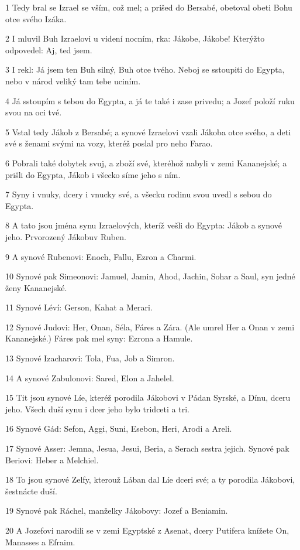 \par 1 Tedy bral se Izrael se vším, což mel; a prišed do Bersabé, obetoval obeti Bohu otce svého Izáka.
\par 2 I mluvil Buh Izraelovi u videní nocním, rka: Jákobe, Jákobe! Kterýžto odpovedel: Aj, ted jsem.
\par 3 I rekl: Já jsem ten Buh silný, Buh otce tvého. Neboj se sstoupiti do Egypta, nebo v národ veliký tam tebe uciním.
\par 4 Já sstoupím s tebou do Egypta, a já te také i zase privedu; a Jozef položí ruku svou na oci tvé.
\par 5 Vstal tedy Jákob z Bersabé; a synové Izraelovi vzali Jákoba otce svého, a deti své s ženami svými na vozy, kteréž poslal pro neho Farao.
\par 6 Pobrali také dobytek svuj, a zboží své, kteréhož nabyli v zemi Kananejské; a prišli do Egypta, Jákob i všecko síme jeho s ním.
\par 7 Syny i vnuky, dcery i vnucky své, a všecku rodinu svou uvedl s sebou do Egypta.
\par 8 A tato jsou jména synu Izraelových, kteríž vešli do Egypta: Jákob a synové jeho. Prvorozený Jákobuv Ruben.
\par 9 A synové Rubenovi: Enoch, Fallu, Ezron a Charmi.
\par 10 Synové pak Simeonovi: Jamuel, Jamin, Ahod, Jachin, Sohar a Saul, syn jedné ženy Kananejské.
\par 11 Synové Léví: Gerson, Kahat a Merari.
\par 12 Synové Judovi: Her, Onan, Séla, Fáres a Zára. (Ale umrel Her a Onan v zemi Kananejské.) Fáres pak mel syny: Ezrona a Hamule.
\par 13 Synové Izacharovi: Tola, Fua, Job a Simron.
\par 14 A synové Zabulonovi: Sared, Elon a Jahelel.
\par 15 Tit jsou synové Líe, kteréž porodila Jákobovi v Pádan Syrské, a Dínu, dceru jeho. Všech duší synu i dcer jeho bylo tridceti a tri.
\par 16 Synové Gád: Sefon, Aggi, Suni, Esebon, Heri, Arodi a Areli.
\par 17 Synové Asser: Jemna, Jesua, Jesui, Beria, a Serach sestra jejich. Synové pak Beriovi: Heber a Melchiel.
\par 18 To jsou synové Zelfy, kterouž Lában dal Líe dceri své; a ty porodila Jákobovi, šestnácte duší.
\par 19 Synové pak Ráchel, manželky Jákobovy: Jozef a Beniamin.
\par 20 A Jozefovi narodili se v zemi Egyptské z Asenat, dcery Putifera knížete On, Manasses a Efraim.
